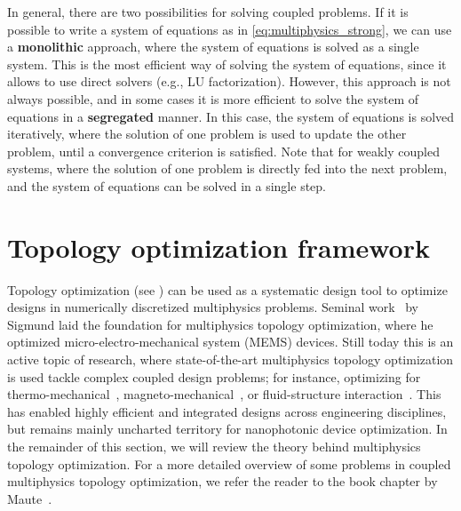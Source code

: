     In general, there are two possibilities for solving coupled problems. If it is
    possible to write a system of equations
    as in \eqref{eq:multiphysics_strong}, we can use a \textbf{monolithic}
    approach, where the system of equations is solved as a single system.
    This is the most efficient way of solving the system of equations, since it
    allows to use direct solvers (e.g., LU factorization).
    However, this approach is not always possible, and in some cases it is more
    efficient to solve the system of equations in a \textbf{segregated} manner.
    In this case, the system of equations is solved iteratively, where the solution
    of one problem is used to update the other problem, until a convergence
    criterion is satisfied. Note that for weakly coupled systems, where the solution 
    of one problem is directly fed into the next problem, and the system of equations 
    can be solved in a single step.

    \section{Topology optimization framework}\label{sec:topopt_theory}
    Topology optimization (see ) can be used as a systematic design tool to optimize designs in numerically discretized multiphysics problems. 
    Seminal work~\cite{MEMS_multi} by Sigmund laid the foundation for multiphysics topology optimization, where he optimized micro-electro-mechanical system (MEMS) devices. 
    Still today this is an active topic of research, where state-of-the-art multiphysics topology optimization is used tackle complex coupled  design problems; for instance, optimizing for thermo-mechanical~\cite{third_thermal}, magneto-mechanical~\cite{magneto}, or fluid-structure interaction~\cite{fsint}. 
    This has enabled highly efficient and integrated designs across engineering disciplines, but remains mainly uncharted territory for nanophotonic device optimization. In the remainder of this section, we will review the theory behind multiphysics topology optimization. For a more detailed overview of some problems in coupled multiphysics
    topology optimization, we refer the reader to the book chapter by Maute~\cite{coupled_topopt}.

